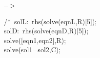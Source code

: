\documentclass[fleqn]{article}
\begin{document}
\noindent%



\noindent
\begin{minipage}[t]{4.000000em}\color{red}\bfseries
 --\ensuremath{\ensuremath{>}}	
\end{minipage}
\begin{minipage}[t]{\textwidth}\color{blue}
/*\ solL:\ rhs(solve(eqnL,R)[5]);\\
solD:\ rhs(solve(eqnD,R)[5]);\\
solve([eqn1,eqn2],R);\\
solve(sol1=sol2,C);\ 
\end{minipage}

\noindent%
\end{document}
